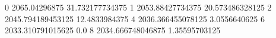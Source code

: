 0 2065.04296875 31.732177734375
1 2053.88427734375 20.573486328125
2 2045.794189453125 12.4833984375
4 2036.366455078125 3.0556640625
6 2033.310791015625 0.0
8 2034.666748046875 1.35595703125
